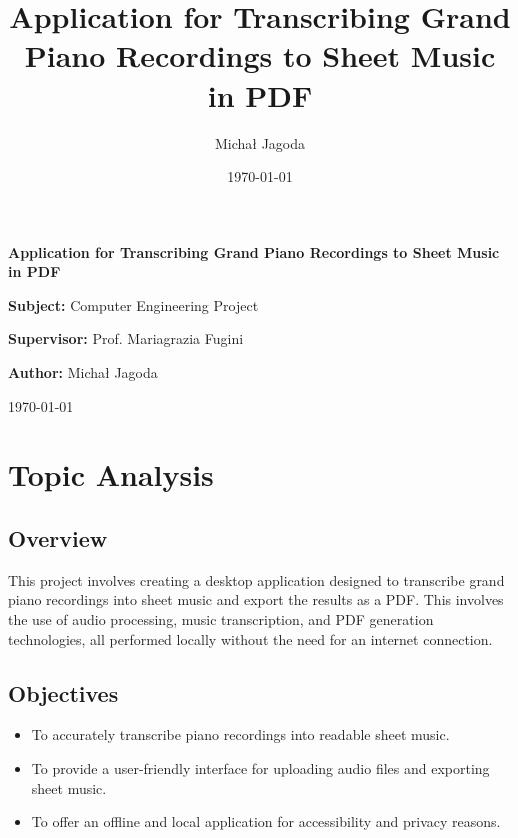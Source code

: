 \documentclass{article}
\title{Application for Transcribing Grand Piano Recordings to Sheet Music in PDF}
\author{Michał Jagoda}
\date{\today}
\begin{document}
\begin{titlepage}
    \centering
    \vspace*{2cm} %
    {\Huge \bfseries Application for Transcribing Grand Piano Recordings to Sheet Music in PDF\par}
    \vspace{8cm}
    {\Large \textbf{Subject:} Computer Engineering Project\par}
    \vspace{0.5cm}
    {\Large \textbf{Supervisor:} Prof. Mariagrazia Fugini\par}
    \vspace{0.5cm}
    {\Large \textbf{Author:} Michał Jagoda\par}
    \vspace{0.5cm}
    {\Large \today\par}
    \vfill
\end{titlepage}

\clearpage %
\tableofcontents
\clearpage %

\section{Topic Analysis}

\subsection{Overview}
This project involves creating a desktop application designed to transcribe grand piano recordings into sheet music and export the results as a PDF. This involves the use of audio processing, music transcription, and PDF generation technologies, all performed locally without the need for an internet connection.

\subsection{Objectives}
\begin{itemize}
    \item To accurately transcribe piano recordings into readable sheet music.
    \item To provide a user-friendly interface for uploading audio files and exporting sheet music.
    \item To offer an offline and local application for accessibility and privacy reasons.
\end{itemize}
\end{document}
